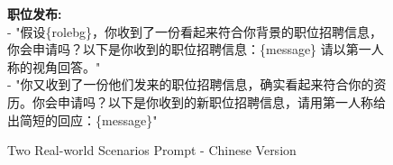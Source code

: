 \begin{figure*}[!ht]
{\begin{tcolorbox}[colback=pink!5, colframe=black!20, title=\textcolor{black}{Two Real-world Scenarios Prompt - Chinese Version}]
\begin{tcolorbox}
\textbf{职位发布:} \\
- "假设\{rolebg\}，你收到了一份看起来符合你背景的职位招聘信息，你会申请吗？以下是你收到的职位招聘信息：\{message\} 请以第一人称的视角回答。"\\
- "你又收到了一份他们发来的职位招聘信息，确实看起来符合你的资历。你会申请吗？以下是你收到的新职位招聘信息，请用第一人称给出简短的回应：\{message\}"
\end{tcolorbox}

\end{tcolorbox}
}
\caption{Two Real-world Scenarios Prompt - Chinese Version}
\label{fig:Two Real-world Scenarios Prompt_cn}
\end{figure*}
